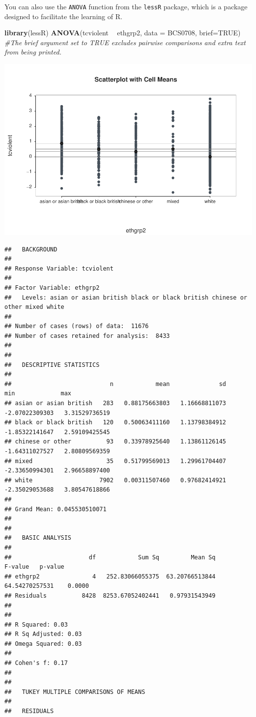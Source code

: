 \documentclass[]{book}
\newenvironment{Shaded}{\begin{snugshade}}{\end{snugshade}}
\newcommand{\CommentTok}[1]{\textcolor[rgb]{0.56,0.35,0.01}{\textit{#1}}}
\newcommand{\DataTypeTok}[1]{\textcolor[rgb]{0.13,0.29,0.53}{#1}}
\newcommand{\KeywordTok}[1]{\textcolor[rgb]{0.13,0.29,0.53}{\textbf{#1}}}
\newcommand{\NormalTok}[1]{#1}
\newcommand{\OperatorTok}[1]{\textcolor[rgb]{0.81,0.36,0.00}{\textbf{#1}}}
\newcommand{\OtherTok}[1]{\textcolor[rgb]{0.56,0.35,0.01}{#1}}
\newcommand{\StringTok}[1]{\textcolor[rgb]{0.31,0.60,0.02}{#1}}
\theoremstyle{definition}
\theoremstyle{definition}
\theoremstyle{definition}
\theoremstyle{remark}
\begin{document}
You can also use the \texttt{ANOVA} function from the \texttt{lessR}
package, which is a package designed to facilitate the learning of R.

\begin{Shaded}
\begin{Highlighting}[]
\KeywordTok{library}\NormalTok{(lessR)}
\KeywordTok{ANOVA}\NormalTok{(tcviolent }\OperatorTok{~}\StringTok{ }\NormalTok{ethgrp2, }\DataTypeTok{data =}\NormalTok{ BCS0708, }\DataTypeTok{brief=}\OtherTok{TRUE}\NormalTok{) }\CommentTok{#The brief argument set to TRUE excludes pairwise comparisons and extra text from being printed.}
\end{Highlighting}
\end{Shaded}

\includegraphics{06-hypothesis_testing_files/figure-latex/unnamed-chunk-29-1.pdf}

\begin{verbatim}
##   BACKGROUND
## 
## Response Variable: tcviolent 
##  
## Factor Variable: ethgrp2 
##   Levels: asian or asian british black or black british chinese or other mixed white 
##  
## Number of cases (rows) of data:  11676 
## Number of cases retained for analysis:  8433 
## 
## 
##   DESCRIPTIVE STATISTICS 
## 
##                            n            mean              sd              min             max 
## asian or asian british   283   0.88175663803   1.16668811073   -2.07022309303   3.31529736519 
## black or black british   120   0.50063411160   1.13798384912   -1.85322141647   2.59109425545 
## chinese or other          93   0.33978925640   1.13861126145   -1.64311027527   2.80809569359 
## mixed                     35   0.51799569013   1.29961704407   -2.33650994301   2.96658897400 
## white                   7902   0.00311507460   0.97682414921   -2.35029053688   3.80547618866 
##  
## Grand Mean: 0.045530510071 
## 
## 
##   BASIC ANALYSIS
## 
##                      df            Sum Sq         Mean Sq         F-value   p-value 
## ethgrp2               4   252.83066055375  63.20766513844 64.54270257531    0.0000 
## Residuals          8428  8253.67052402441   0.97931543949 
## 
## 
## R Squared: 0.03 
## R Sq Adjusted: 0.03 
## Omega Squared: 0.03 
##  
## Cohen's f: 0.17 
## 
## 
##   TUKEY MULTIPLE COMPARISONS OF MEANS
## 
##   RESIDUALS
\end{verbatim}
\end{document}
